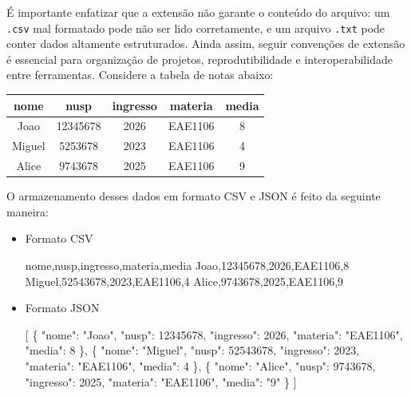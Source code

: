 \documentclass[
  brazilian,
  letterpaper,
  DIV=11,
  numbers=noendperiod]{scrreprt}
\newenvironment{Shaded}{\begin{snugshade}}{\end{snugshade}}
\newcommand{\NormalTok}[1]{\textcolor[rgb]{0.00,0.23,0.31}{#1}}
\begin{document}
É importante enfatizar que a extensão não garante o conteúdo do arquivo:
um \texttt{.csv} mal formatado pode não ser lido corretamente, e um
arquivo \texttt{.txt} pode conter dados altamente estruturados. Ainda
assim, seguir convenções de extensão é essencial para organização de
projetos, reprodutibilidade e interoperabilidade entre ferramentas.
Considere a tabela de notas abaixo:

\begin{longtable}[]{@{}ccccc@{}}
\toprule\noalign{}
nome & nusp & ingresso & materia & media \\
\midrule\noalign{}
\endhead
\bottomrule\noalign{}
\endlastfoot
Joao & 12345678 & 2026 & EAE1106 & 8 \\
Miguel & 5253678 & 2023 & EAE1106 & 4 \\
Alice & 9743678 & 2025 & EAE1106 & 9 \\
\end{longtable}

O armazenamento desses dados em formato CSV e JSON é feito da seguinte
maneira:

\begin{itemize}
\item
  Formato CSV

\begin{Shaded}
\begin{Highlighting}[]
\NormalTok{nome,nusp,ingresso,materia,media}
\NormalTok{Joao,12345678,2026,EAE1106,8}
\NormalTok{Miguel,52543678,2023,EAE1106,4}
\NormalTok{Alice,9743678,2025,EAE1106,9}
\end{Highlighting}
\end{Shaded}
\item
  Formato JSON

\begin{Shaded}
\begin{Highlighting}[]
\NormalTok{[}
\NormalTok{\{}
\NormalTok{   "nome": "Joao",}
\NormalTok{   "nusp": 12345678,}
\NormalTok{   "ingresso": 2026,}
\NormalTok{   "materia": "EAE1106",}
\NormalTok{   "media": 8}
\NormalTok{\},}
\NormalTok{\{}
\NormalTok{   "nome": "Miguel",}
\NormalTok{   "nusp": 52543678,}
\NormalTok{   "ingresso": 2023,}
\NormalTok{   "materia": "EAE1106",}
\NormalTok{   "media": 4}
\NormalTok{\},}
\NormalTok{\{}
\NormalTok{   "nome": "Alice",}
\NormalTok{   "nusp": 9743678,}
\NormalTok{   "ingresso": 2025,}
\NormalTok{   "materia": "EAE1106",}
\NormalTok{   "media": "9"}
\NormalTok{\}}
\NormalTok{]}
\end{Highlighting}
\end{Shaded}
\end{itemize}
\end{document}
